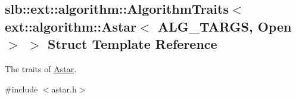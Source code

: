 \hypertarget{structslb_1_1ext_1_1algorithm_1_1AlgorithmTraits_3_01ext_1_1algorithm_1_1Astar_3_01ALG__TARGS_00_01Open_01_4_01_4}{}\subsection{slb\+:\+:ext\+:\+:algorithm\+:\+:Algorithm\+Traits$<$ ext\+:\+:algorithm\+:\+:Astar$<$ A\+L\+G\+\_\+\+T\+A\+R\+GS, Open $>$ $>$ Struct Template Reference}
\label{structslb_1_1ext_1_1algorithm_1_1AlgorithmTraits_3_01ext_1_1algorithm_1_1Astar_3_01ALG__TARGS_00_01Open_01_4_01_4}


The traits of \hyperlink{structslb_1_1ext_1_1algorithm_1_1Astar}{Astar}.  




{\ttfamily \#include $<$astar.\+h$>$}

